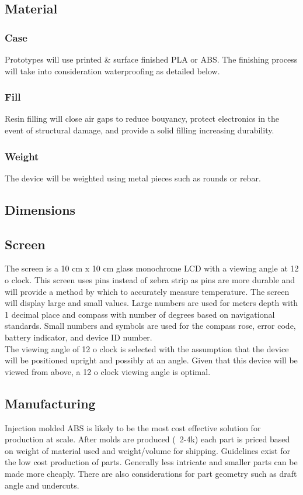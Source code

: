 \documentclass{article}
\begin{document}
\subsection{Material}
\subsubsection{Case}
Prototypes will use printed \& surface finished PLA or ABS. The finishing process will take into consideration waterproofing as detailed below.

\subsubsection{Fill}
Resin filling will close air gaps to reduce bouyancy, protect electronics in the event of structural damage, and provide a solid filling increasing durability. 

\subsubsection{Weight}
The device will be weighted using metal pieces such as rounds or rebar.

\subsection{Dimensions}


\subsection{Screen}
The screen is a 10 cm x 10 cm glass monochrome LCD with a viewing angle at 12 o clock. This screen uses pins instead of zebra strip as pins are more durable and will provide a method by which to accurately measure temperature. The screen will display large and small values. Large numbers are used for meters depth with 1 decimal place and compass with number of degrees based on navigational standards. Small numbers and symbols are used for the compass rose, error code, battery indicator, and device ID number.\\[12pt]
The viewing angle of 12 o clock is selected with the assumption that the device will be positioned upright and possibly at an angle. Given that this device will be viewed from above, a 12 o clock viewing angle is optimal.

\subsection{Manufacturing}
Injection molded ABS is likely to be the most cost effective solution for production at scale. After molds are produced (~2-4k) each part is priced based on weight of material used and weight/volume for shipping. Guidelines exist for the low cost production of parts. Generally less intricate and smaller parts can be made more cheaply. There are also considerations for part geometry such as draft angle and undercuts.\\[12pt]
\end{document}
